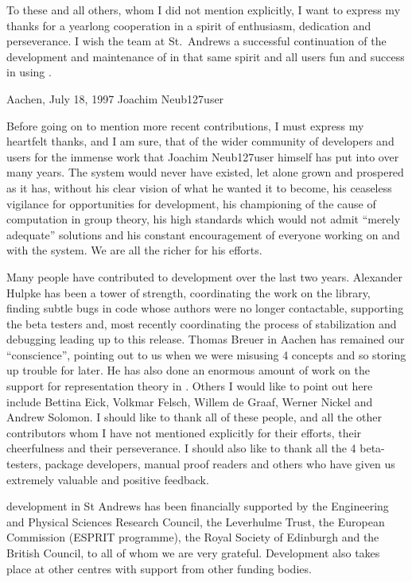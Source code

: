    To these and all others, whom I did not mention  explicitly, I want to
   express    my thanks for   a  yearlong  cooperation    in a  spirit of
   enthusiasm,   dedication  and perseverance.    I   wish  the team   at
   St.~Andrews  a   successful   continuation   of  the   development and
   maintenance   of {\GAP}  in  that same  spirit and  all  users fun and
   success in using {\GAP}.

   Aachen, July 18, 1997 \hfill Joachim Neub\accent127user
\endgroup

Before going  on to mention more  recent contributions, I must express my
heartfelt thanks, and I am  sure, that of  the wider community of  {\GAP}
developers and users for the immense work that Joachim Neub\accent127user
himself has put into {\GAP} over many years.  The system would never have
existed, let  alone  grown and prospered  as it   has, without his  clear
vision of  what  he wanted  it  to  become, his ceaseless  vigilance  for
opportunities    for development, his    championing  of   the  cause  of
computation  in group theory,  his high standards   which would not admit
``merely adequate'' solutions and  his constant encouragement of everyone
working on and with the system. We are all the richer for his efforts.


Many people  have contributed  to {\GAP}  development over the  last  two
years.  Alexander  Hulpke has been  a tower of strength, coordinating the
work on  the library, finding subtle bugs  in code whose authors  were no
longer  contactable,  supporting the  beta   testers and,  most  recently
coordinating the process of   stabilization and debugging leading  up  to
this release. Thomas Breuer   in Aachen has remained our  ``conscience'',
pointing out to us when we were misusing {\GAP} 4 concepts and so storing
up trouble for later. He has also done an  enormous amount of work on the
support for  representation theory in   {\GAP}.  Others I  would like  to
point out here  include Bettina Eick,  Volkmar  Felsch, Willem de  Graaf,
Werner  Nickel and Andrew  Solomon.  I should like  to thank all of these
people,  and   all the other   contributors  whom  I  have not  mentioned
explicitly for their efforts, their  cheerfulness and their perseverance.
I  should also   like  to  thank  all the   {\GAP}4 beta-testers, package
developers,  manual proof readers and others  who have given us extremely
valuable and positive feedback.

{\GAP} development in  St Andrews has  been financially supported  by the
Engineering and Physical Sciences Research Council, the Leverhulme Trust,
the European   Commission  (ESPRIT  programme),  the  Royal   Society  of
Edinburgh and the  British Council, to all of  whom we are very grateful.
Development  also takes  place at other  centres  with support from other
funding bodies.

